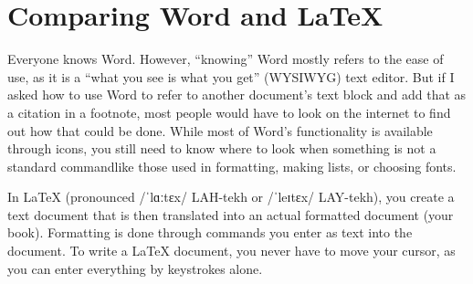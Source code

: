 


\chapter{Comparing Word and LaTeX}\label{differencebetweenwordandlatex:cha}

Everyone knows Word. However, ``knowing'' Word mostly refers to the ease of use, as it is a ``what you see is what you get'' (WYSIWYG) text editor. But if I asked how to use Word to refer to another document's text block and add that as a citation in a footnote, most people would have to look on the internet to find out how that could be done. While most of Word's functionality is available through icons, you still need to know where to look when something is not a standard command\emdash{}like those used in formatting, making lists, or choosing fonts.



In LaTeX (pronounced \ifxetex/ˈlɑːtɛx/\fi{} LAH-tekh or \ifxetex/ˈleɪtɛx/\fi{} LAY-tekh), you create a text document that is then translated into an actual formatted document (your book). Formatting is done through commands you enter as text into the document. To write a LaTeX document, you never have to move your cursor, as you can enter everything by keystrokes alone.

